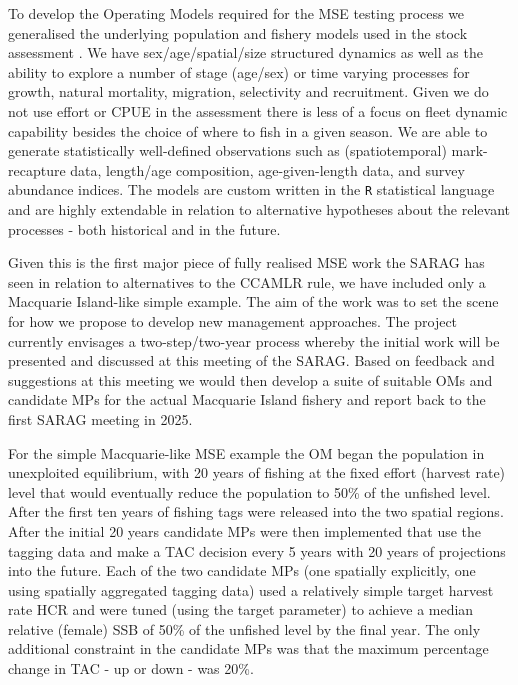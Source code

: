 \documentclass[12pt,a4paper,twoside,times,sky,standard]{csiroreport2017}
\begin{document}
To develop the Operating Models required for the MSE testing process we generalised the underlying population and fishery models used in the stock assessment \cite{misa}. We have sex/age/spatial/size structured dynamics as well as the ability to explore a number of stage (age/sex) or time varying processes for growth, natural mortality, migration, selectivity and recruitment. Given we do not use effort or CPUE in the assessment there is less of a focus on fleet dynamic capability besides the choice of where to fish in a given season. We are able to generate statistically well-defined observations such as (spatiotemporal) mark-recapture data, length/age composition, age-given-length data, and survey abundance indices. The models are custom written in the \texttt{R} statistical language and are highly extendable in relation to alternative hypotheses about the relevant processes - both historical and in the future.

Given this is the first major piece of fully realised MSE work the SARAG has seen in relation to alternatives to the CCAMLR rule, we have included only a Macquarie Island-like simple example. The aim of the work was to set the scene for how we propose to develop new management approaches. The project currently envisages a two-step/two-year process whereby the initial work will be presented and discussed at this meeting of the SARAG. Based on feedback and suggestions at this meeting we would then develop a suite of suitable OMs and candidate MPs for the actual Macquarie Island fishery and report back to the first SARAG meeting in 2025.

For the simple Macquarie-like MSE example the OM began the population in unexploited equilibrium, with 20 years of fishing at the fixed effort (harvest rate) level that would eventually reduce the population to 50\% of the unfished level. After the first ten years of fishing tags were released into the two spatial regions. After the initial 20 years candidate MPs were then implemented that use the tagging data and make a TAC decision every 5 years with 20 years of projections into the future. Each of the two candidate MPs (one spatially explicitly, one using spatially aggregated tagging data) used a relatively simple target harvest rate HCR and were tuned (using the target parameter) to achieve a median relative (female) SSB of 50\% of the unfished level by the final year. The only additional constraint in the candidate MPs was that the maximum percentage change in TAC - up or down - was 20\%.
\end{document}
